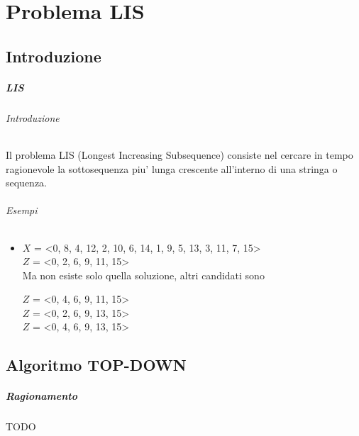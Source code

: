 \chapter{Problema LIS}

\section{Introduzione}

\paragraph{LIS}

\subparagraph{Introduzione}

Il problema LIS (Longest Increasing Subsequence) consiste nel cercare in tempo ragionevole la sottosequenza piu' lunga crescente all'interno di una stringa o sequenza.

\subparagraph{Esempi}

\begin{itemize}

\item

$X$ = <0, 8, 4, 12, 2, 10, 6, 14, 1, 9, 5, 13, 3, 11, 7, 15> \\
$Z$ = <0, 2, 6, 9, 11, 15> \\

Ma non esiste solo quella soluzione, altri candidati sono

$Z$ = <0, 4, 6, 9, 11, 15> \\
$Z$ = <0, 2, 6, 9, 13, 15> \\
$Z$ = <0, 4, 6, 9, 13, 15> \\

\end{itemize}

\section{Algoritmo TOP-DOWN}

\paragraph{Ragionamento}

TODO